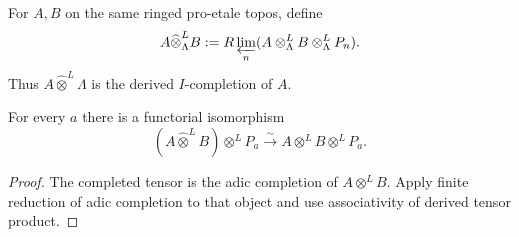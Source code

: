 \begin{definition}
\label{def:weil-pbc-completed-tensor-product}
For $A,B$ on the same ringed pro-etale topos, define
\[
 A\widehat\otimes^L_\Lambda B:=
 R\varprojlim_n(A\otimes^L_\Lambda B\otimes^L_\Lambda P_n).
\]
Thus $A\widehat\otimes^L\Lambda$ is the derived $I$-completion of $A$.
\end{definition}

\begin{lemma}
\label{lemma:weil-pbc-completed-tensor-reduction}
For every $a$ there is a functorial isomorphism
\[
 (A\widehat\otimes^LB)\otimes^LP_a
 \xrightarrow{\sim}A\otimes^LB\otimes^LP_a.
\]
\end{lemma}
\begin{proof}

The completed tensor is the adic completion of $A\otimes^LB$.  Apply finite
reduction of adic completion to that object and use associativity of derived
tensor product.
\end{proof}

